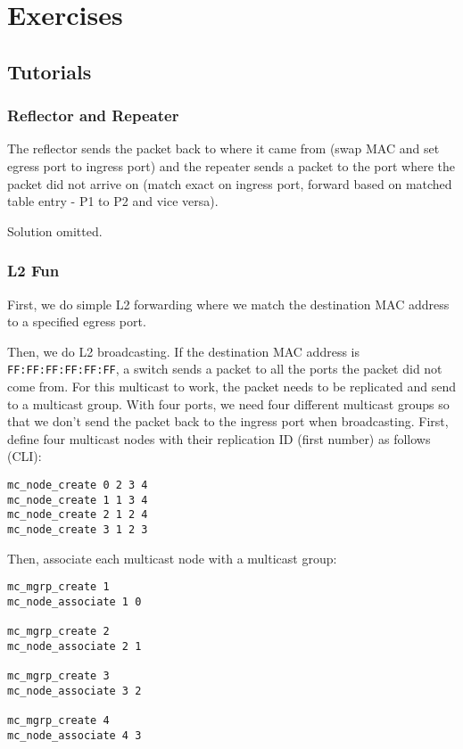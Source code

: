 \section{Exercises}


\subsection{Tutorials}

\subsubsection{Reflector and Repeater}

The reflector sends the packet back to where it came from (swap MAC and set egress port to ingress port) and the repeater sends a packet to the port where the packet did not arrive on (match exact on ingress port, forward based on matched table entry - P1 to P2 and vice versa).

Solution omitted.

\subsubsection{L2 Fun}

First, we do simple L2 forwarding where we match the destination MAC address to a specified egress port.

Then, we do L2 broadcasting. If the destination MAC address is \texttt{FF:FF:FF:FF:FF:FF}, a switch sends a packet to all the ports the packet did not come from. For this multicast to work, the packet needs to be replicated and send to a multicast group. With four ports, we need four different multicast groups so that we don't send the packet back to the ingress port when broadcasting. First, define four multicast nodes with their replication ID (first number) as follows (CLI):

\begin{lstlisting}
mc_node_create 0 2 3 4
mc_node_create 1 1 3 4
mc_node_create 2 1 2 4
mc_node_create 3 1 2 3
\end{lstlisting}

Then, associate each multicast node with a multicast group:

\begin{lstlisting}
mc_mgrp_create 1
mc_node_associate 1 0

mc_mgrp_create 2
mc_node_associate 2 1

mc_mgrp_create 3
mc_node_associate 3 2

mc_mgrp_create 4
mc_node_associate 4 3
\end{lstlisting}

